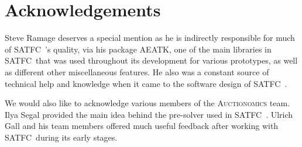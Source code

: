 \documentclass[
10pt, %
letterpaper, %
oneside, %
headinclude,footinclude, %
BCOR5mm, %
needspace, %
]{scrartcl}
\newcommand{\SATFC}{\textsc{SATFC}~}
\newcommand{\AEATK}{\textsc{AEATK}}
\begin{document}
\section{Acknowledgements} 

Steve Ramage deserves a special mention as he is indirectly responsible for much of \SATFC's quality, via his package \AEATK, one of the main libraries in \SATFC that was used throughout its development for various prototypes, as well as different other miscellaneous features. He also was a constant source of technical help and knowledge when it came to the software design of \SATFC.

We would also like to acknowledge various members of the \textsc{Auctionomics} team. Ilya Segal provided the main idea behind the pre-solver used in \SATFC. Ulrich Gall and his team members offered much useful feedback after working with \SATFC during its early stages.
\end{document}
